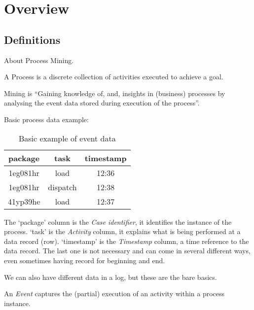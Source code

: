 

\section*{Overview}

\subsection*{Definitions}

About Process Mining.

\begin{definition}
	A Process is a discrete collection of activities executed to achieve a goal.
\end{definition}

\begin{definition}
	Mining is ``Gaining knowledge of, and, insights in (business) processes by analysing the event data stored during execution of the process''.
\end{definition}

Basic process data example:

\begin{table}[htpb]
	\centering
	\caption{Basic example of event data}
	\label{tab:event-data}
	\begin{tabular}{|c|c|c|}
		\hline
		package & task & timestamp \\
		\hline
		1eg081hr  & load      & 12:36 \\
		1eg081hr  & dispatch  & 12:38 \\
		41yp39he  & load      & 12:37 \\
		\hline
	\end{tabular}
\end{table}

The `package' column is the \emph{Case identifier}, it identifies the instance of the process. `task' is the \emph{Activity} column, it explains what is being performed at a data record (row). `timestamp' is the \emph{Timestamp} column, a time reference to the data record. The last one is not necessary and can come in several different ways, even sometimes having record for beginning and end.

We can also have different data in a log, but these are the bare basics.

\begin{definition}
	An \emph{Event} captures the (partial) execution of an activity within a process instance.
\end{definition}

